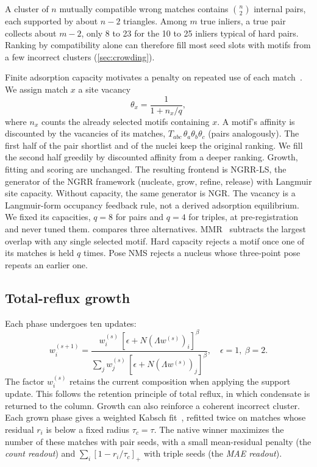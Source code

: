 A cluster of $n$ mutually compatible wrong matches contains $\binom{n}{2}$ internal pairs, each supported by about $n-2$ triangles. Among $m$ true inliers, a true pair collects about $m-2$, only 8 to 23 for the 10 to 25 inliers typical of hard pairs. Ranking by compatibility alone can therefore fill most seed slots with motifs from a few incorrect clusters (\cref{sec:crowding}).

Finite adsorption capacity motivates a penalty on repeated use of each match~\cite{langmuir1918}. We assign match $x$ a site vacancy
\begin{equation}
\theta_x=\frac{1}{1+n_x/q},
\label{eq:vacancy}
\end{equation}
where $n_x$ counts the already selected motifs containing $x$. A motif's affinity is discounted by the vacancies of its matches, $T_{abc}\,\theta_a\theta_b\theta_c$ (pairs analogously). The first half of the pair shortlist and of the nuclei keep the original ranking. We fill the second half greedily by discounted affinity from a deeper ranking. Growth, fitting and scoring are unchanged. The resulting frontend is NGRR-LS, the generator of the NGRR framework (nucleate, grow, refine, release) with Langmuir site capacity. Without capacity, the same generator is NGR. The vacancy is a Langmuir-form occupancy feedback rule, not a derived adsorption equilibrium. We fixed its capacities, $q=8$ for pairs and $q=4$ for triples, at pre-registration and never tuned them.  compares three alternatives. MMR~\cite{carbonell1998mmr} subtracts the largest overlap with any single selected motif. Hard capacity rejects a motif once one of its matches is held $q$ times. Pose NMS rejects a nucleus whose three-point pose repeats an earlier one.

\subsection{Total-reflux growth}
\label{sec:reflux}

Each phase undergoes ten updates:
\begin{equation}
w_i^{(s+1)}=\frac{w_i^{(s)}\,[\epsilon+N(\Lambda w^{(s)})_i]^{\beta}}{\sum_j w_j^{(s)}\,[\epsilon+N(\Lambda w^{(s)})_j]^{\beta}},\quad \epsilon=1,\ \beta=2.
\label{eq:growth}
\end{equation}
The factor $w_i^{(s)}$ retains the current composition when applying the support update. This follows the retention principle of total reflux, in which condensate is returned to the column. Growth can also reinforce a coherent incorrect cluster. Each grown phase gives a weighted Kabsch fit~\cite{kabsch1976}, refitted twice on matches whose residual $r_i$ is below a fixed radius $\tau_c=\tau$. The native winner maximizes the number of these matches with pair seeds, with a small mean-residual penalty (the \emph{count readout}) and $\sum_i[1-r_i/\tau_c]_+$ with triple seeds (the \emph{MAE readout}).

